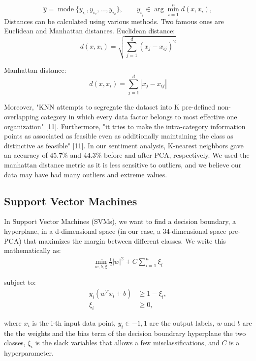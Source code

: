 \documentclass[conference]{IEEEtran}
\begin{document}
\begin{equation}
    \hat{y} = \operatorname{mode}\{y_{i_1}, y_{i_2}, \ldots, y_{i_k}\}, \qquad y_{i_j} \in \arg\min_{i=1}^n d(x, x_i),
\end{equation}
Distances can be calculated using various methods. Two famous ones are Euclidean and Manhattan distances.
Euclidean distance:
\begin{equation}
d(x, x_i) = \sqrt{\sum_{j=1}^{d}(x_j - x_{ij})^2}
\end{equation}

Manhattan distance:
\begin{equation}
d(x, x_i) = \sum_{j=1}^{d}|x_j - x_{ij}|
\end{equation}

Moreover, "KNN attempts to segregate the dataset into K pre-defined non-overlapping category in which every data factor belongs to most effective one organization" [11]. Furthermore, "it tries to make the intra-category information points as associated as feasible even as additionally maintaining the class as distinctive as feasible" [11].
In our sentiment analysis, K-nearest neighbors gave an accuracy of 45.7\% and 44.3\% before and after PCA, respectively. We used the manhattan distance metric as it is less sensitive to outliers, and we believe our data may have had many outliers and extreme values.

\subsection{Support Vector Machines}
In Support Vector Machines (SVMs), we want to find a decision boundary, a hyperplane, in a d-dimensional space (in our case, a 34-dimensional space pre-PCA) that maximizes the margin between different classes. We write this mathematically as:
\begin{align*}
\min_{{w}, b, \xi} \frac{1}{2} |{w}|^2 + C \sum_{i=1}^n \xi_i
\end{align*}

subject to:
\begin{align*}
y_i({w}^T {x}_i + b) &\geq 1 - \xi_i, \\
\xi_i &\geq 0,
\end{align*}

where $x_i$ is the i-th input data point, $y_i \in {-1,1}$ are the output labels, ${w}$ and $b$ are the the weights and the bias term of the decision boundrary hyperplane the two classes, $\xi_i$ is the slack variables that allows a few misclassifications, and $C$ is a hyperparameter.
\end{document}

